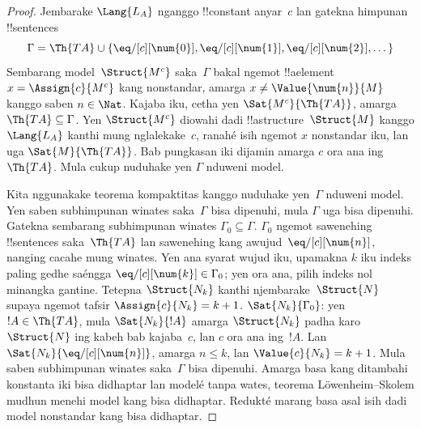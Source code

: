 \documentclass[../../../include/open-logic-section]{subfiles}
\begin{document}
\begin{proof}
Jembarake $\Lang{L_A}$
nganggo !!{constant} anyar~$c$
lan gatekna himpunan
!!{sentence}s
\[
\Gamma = \Th{TA} \cup \{\eq/[c][\num{0}], \eq/[c][\num{1}],
\eq/[c][\num{2}], \dots\}
\]
Sembarang model~$\Struct{M^c}$
saka~$\Gamma$ bakal ngemot
!!a{element}~$x =
\Assign{c}{M^c}$
kang nonstandar, amarga
$x \neq \Value{\num{n}}{M}$
kanggo saben
$n \in \Nat$.
Kajaba iku, cetha yen
$\Sat{M^c}{\Th{TA}}$,
amarga $\Th{TA} \subseteq \Gamma$.
Yen $\Struct{M^c}$
diowahi dadi !!a{structure}~$\Struct{M}$
kanggo $\Lang{L_A}$
kanthi mung nglalekake~$c$,
ranahé isih ngemot
$x$ nonstandar iku,
lan uga
$\Sat{M}{\Th{TA}}$.
Bab pungkasan iki
dijamin amarga $c$
ora ana ing~$\Th{TA}$.
Mula cukup nuduhake
yen $\Gamma$ nduweni model.

Kita nggunakake
teorema kompaktitas kanggo
nuduhake yen~$\Gamma$
nduweni model.
Yen saben subhimpunan
winates saka~$\Gamma$
bisa dipenuhi,
mula $\Gamma$ uga
bisa dipenuhi.
Gatekna sembarang
subhimpunan winates
$\Gamma_0 \subseteq \Gamma$.
$\Gamma_0$ ngemot
sawenehing !!{sentence}s
saka~$\Th{TA}$
lan sawenehing kang
awujud~$\eq/[c][\num{n}]$,
nanging cacahe mung winates.
Yen ana syarat wujud iku,
upamakna $k$ iku
indeks paling gedhe
saéngga
$\eq/[c][\num{k}] \in \Gamma_0$;
yen ora ana, pilih
indeks nol minangka gantine.
Tetepna $\Struct{N_k}$
kanthi njembarake~$\Struct{N}$
supaya ngemot tafsir
$\Assign{c}{N_k} = k+1$.
$\Sat{N_k}{\Gamma_0}$:
yen $!A \in \Th{TA}$,
mula $\Sat{N_k}{!A}$
amarga $\Struct{N_k}$
padha karo~$\Struct{N}$
ing kabeh bab kajaba~$c$,
lan $c$ ora ana
ing~$!A$.
Lan
$\Sat{N_k}{\eq/[c][\num{n}]}$,
amarga $n \le k$,
lan
$\Value{c}{N_k} = k+1$.
Mula saben subhimpunan
winates saka~$\Gamma$
bisa dipenuhi.
Amarga basa kang ditambahi
konstanta iki bisa didhaptar
lan modelé tanpa wates,
teorema Löwenheim--Skolem mudhun
menehi model kang bisa didhaptar.
Redukté marang basa asal
isih dadi model nonstandar
kang bisa didhaptar.
\end{proof}
\end{document}
